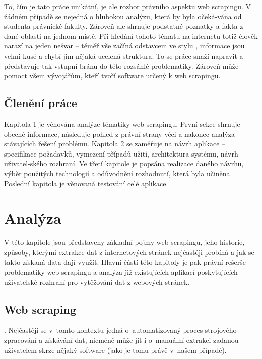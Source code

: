 \documentclass[thesis=B,czech]{FITthesis}[2012/06/26]
\begin{document}
\begin{introduction}
	To, čím je tato práce unikátní, je ale rozbor právního aspektu web scrapingu. V žádném případě se nejedná o hlubokou analýzu, která by byla očeká-vána od studenta právnické fakulty. Zároveň ale shrnuje podstatné poznatky a fakta z dané oblasti na jednom místě. Při hledání tohoto tématu na internetu totiž člověk narazí na jeden nešvar -- téměř vše začíná odstavcem ve stylu , informace jsou velmi kusé a chybí jim nějaká ucelená struktura. To se práce snaží napravit a představuje tak vstupní bránu do této rozsáhlé problematiky. Zároveň může pomoct všem vývojářům, kteří tvoří software určený k web scrapingu.
	
	\section*{Členění práce}
	Kapitola 1 je věnována analýze tématiky web scrapingu. První sekce shrnuje obecné informace, následuje pohled z právní strany věci a nakonec analýza stávajících řešení problému. Kapitola 2 se zaměřuje na návrh aplikace -- specifikace požadavků, vymezení případů užití, architektura systému, návrh uživatel-ského rozhraní. Ve třetí kapitole je popsána realizace daného návrhu, výběr použitých technologií a odůvodnění rozhodnutí, která byla učiněna. Poslední kapitola je věnovaná testování celé aplikace.
\end{introduction}




\chapter{Analýza}
V této kapitole jsou představeny základní pojmy web scrapingu, jeho historie, způsoby, kterými extrakce dat z internetových stránek nejčastěji probíhá a jak se takto získaná data dají využít. Hlavní částí této kapitoly je pak právní rešerše problematiky web scrapingu a analýza již existujících aplikací poskytujících uživatelské rozhraní pro vytěžování dat z webových stránek.


\section{Web scraping}
\cite[překlad autora]{web_scraping_def}. Nejčastěji se v~tomto kontextu jedná o~automatizovaný proces strojového zpracování a získávání dat, nicméně může jít i o~manuální extrakci zadanou uživatelem skrze nějaký software (jako je tomu právě v~našem případě).
\end{document}
